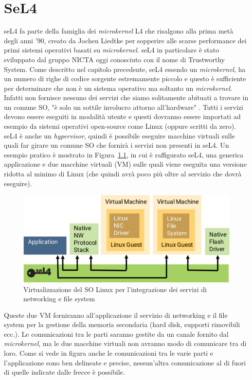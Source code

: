 \chapter{SeL4}
seL4 fa parte della famiglia dei \textit{microkernel} L4 che risalgono alla prima metà degli anni '90, creato da Jochen Liedtke per sopperire alle scarse performance dei primi sistemi operativi basati su \textit{microkernel}. seL4 in particolare è stato sviluppato dal gruppo NICTA oggi conosciuto con il nome di Trustworthy System.
Come descritto nel capitolo precedente, seL4 essendo un \textit{microkernel}, ha un numero di righe di codice sorgente estremamente piccolo e questo è sufficiente per determinare che non è un sistema operativo ma soltanto un \textit{microkernel}. Infatti non fornisce nessuno dei servizi che siamo solitamente abituati a trovare in un comune SO, "è solo un sottile involucro attorno all'hardware" \cite{sel4-whitepaper}. Tutti i servizi devono essere eseguiti in modalità utente e questi dovranno essere importati ad esempio da sistemi operativi open-source come Linux (oppure scritti da zero). seL4 è anche un \textit{hypervisor}, quindi è possibile eseguire macchine virtuali sulle quali far girare un comune SO che fornirà i servizi non presenti in seL4.
Un esempio pratico è mostrato in Figura~\ref{fig:Virtualizzazione}, in cui è raffigurato seL4, una generica applicazione e due macchine virtuali (VM) sulle quali viene eseguita una versione ridotta al minimo di Linux (che quindi avrà poco più oltre al servizio che dovrà eseguire).
\begin{figure}[h]
  \includegraphics[width=\linewidth]{img/seL4Hypervisor.png}
  \caption{Virtualizzazione del SO Linux per l'integrazione dei servizi di networking e file system}
  \label{fig:Virtualizzazione}
\end{figure}
Queste due VM forniranno all'applicazione il servizio di networking e il file system per la gestione della memoria secondaria (hard disk, supporti rimovibili ecc.). Le comunicazioni tra le parti saranno gestite da un canale fornito dal \textit{microkernel}, ma le due macchine virtuali non avranno modo di comunicare tra di loro. Come si vede in figura anche le comunicazioni tra le varie parti e l'applicazione sono ben delineate e precise, nessun'altra comunicazione al di fuori di quelle indicate dalle frecce è possibile.

